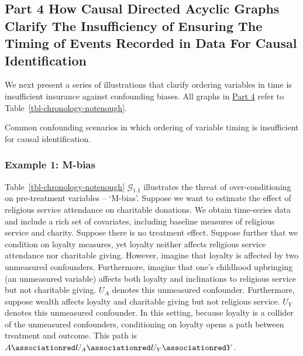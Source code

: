 \documentclass[
  single column]{article}
\begin{document}
\subsection{Part 4 How Causal Directed Acyclic Graphs Clarify The
Insufficiency of Ensuring The Timing of Events Recorded in Data For
Causal Identification}\label{id-sec-4}

We next present a series of illustrations that clarify ordering
variables in time is insufficient insurance against confounding biases.
All graphs in \hyperref[id-sec-4]{Part 4} refer to
Table~\ref{tbl-chronology-notenough}.

\begin{table}

\caption{\label{tbl-chronology-notenough}Common confounding scenarios in
which ordering of variable timing is insufficient for causal
identification.}

\centering{

\terminologychronologicalhygeineNOTENOUGH

}

\end{table}%

\subsubsection{Example 1: M-bias}\label{example-1-m-bias}

Table~\ref{tbl-chronology-notenough} \(\mathcal{G}_{1.1}\) illustrates
the threat of over-conditioning on pre-treatment variables -- `M-bias'.
Suppose we want to estimate the effect of religious service attendance
on charitable donations. We obtain time-series data and include a rich
set of covariates, including baseline measures of religious service and
charity. Suppose there is no treatment effect. Suppose further that we
condition on loyalty measures, yet loyalty neither affects religious
service attendance nor charitable giving. However, imagine that loyalty
is affected by two unmeasured confounders. Furthermore, imagine that
one's childhood upbringing (an unmeasured variable) affects both loyalty
and inclinations to religious service but not charitable giving. \(U_A\)
denotes this unmeasured confounder. Furthermore, suppose wealth affects
loyalty and charitable giving but not religious service. \(U_Y\) denotes
this unmeasured confounder. In this setting, because loyalty is a
collider of the unmeasured confounders, conditioning on loyalty opens a
path between treatment and outcome. This path is
\(A \associationred U_A \associationred U_Y \associationred Y\).
\end{document}

